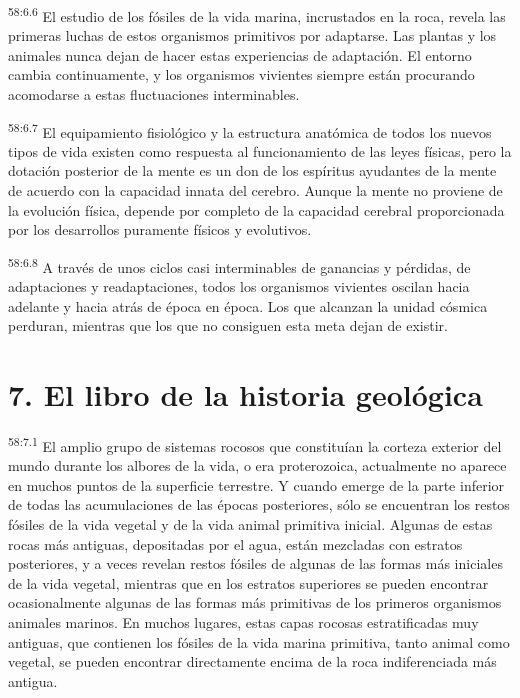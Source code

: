 \par
\textsuperscript{58:6.6} El estudio de los fósiles de la vida marina, incrustados en la roca, revela las primeras luchas de estos organismos primitivos por adaptarse. Las plantas y los animales nunca dejan de hacer estas experiencias de adaptación. El entorno cambia continuamente, y los organismos vivientes siempre están procurando acomodarse a estas fluctuaciones interminables.

\par
\textsuperscript{58:6.7} El equipamiento fisiológico y la estructura anatómica de todos los nuevos tipos de vida existen como respuesta al funcionamiento de las leyes físicas, pero la dotación posterior de la mente es un don de los espíritus ayudantes de la mente de acuerdo con la capacidad innata del cerebro. Aunque la mente no proviene de la evolución física, depende por completo de la capacidad cerebral proporcionada por los desarrollos puramente físicos y evolutivos.

\par
\textsuperscript{58:6.8} A través de unos ciclos casi interminables de ganancias y pérdidas, de adaptaciones y readaptaciones, todos los organismos vivientes oscilan hacia adelante y hacia atrás de época en época. Los que alcanzan la unidad cósmica perduran, mientras que los que no consiguen esta meta dejan de existir.

\section*{7. El libro de la historia geológica}
\par
\textsuperscript{58:7.1} El amplio grupo de sistemas rocosos que constituían la corteza exterior del mundo durante los albores de la vida, o era proterozoica, actualmente no aparece en muchos puntos de la superficie terrestre. Y cuando emerge de la parte inferior de todas las acumulaciones de las épocas posteriores, sólo se encuentran los restos fósiles de la vida vegetal y de la vida animal primitiva inicial. Algunas de estas rocas más antiguas, depositadas por el agua, están mezcladas con estratos posteriores, y a veces revelan restos fósiles de algunas de las formas más iniciales de la vida vegetal, mientras que en los estratos superiores se pueden encontrar ocasionalmente algunas de las formas más primitivas de los primeros organismos animales marinos. En muchos lugares, estas capas rocosas estratificadas muy antiguas, que contienen los fósiles de la vida marina primitiva, tanto animal como vegetal, se pueden encontrar directamente encima de la roca indiferenciada más antigua.

